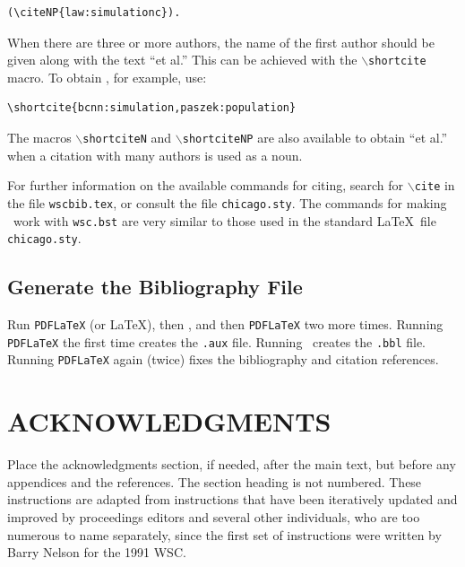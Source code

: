 \documentclass{wscpaperproc}
\theoremstyle{wsc}
\begin{document}
\begin{verbatim}
(\citeNP{law:simulationc}).
\end{verbatim}\vspace{5mm}

When there are three or more authors, the name of the first author should be given along with the text ``et al.'' This can be achieved with the {\tt $\backslash$shortcite} macro. To obtain , for example, use: \newline


\begin{verbatim}
\shortcite{bcnn:simulation,paszek:population}
\end{verbatim}\vspace{5mm}

\noindent The macros {\tt $\backslash$shortciteN} and {\tt $\backslash$shortciteNP} are also available to obtain ``et al.'' when a citation with many authors is used as a noun.

For further information on the available commands for citing, search for {\tt $\backslash$cite} in the file {\tt wscbib.tex}, or consult the file {\tt chicago.sty}. The commands for making \BibTeX\ work with {\tt wsc.bst} are very similar to those used in the standard \LaTeX\ file {\tt chicago.sty}.

\subsection{Generate the Bibliography File}

Run {\tt PDFLaTeX} (or \LaTeX), then \BibTeX, and then {\tt PDFLaTeX} two more times. Running {\tt PDFLaTeX} the first time creates the \texttt{.aux} file. Running \BibTeX\ creates the {\tt .bbl} file. Running {\tt PDFLaTeX} again (twice) fixes the bibliography and citation references.


\section*{ACKNOWLEDGMENTS}
Place the acknowledgments section, if needed, after the main text, but before any appendices and the references. The section heading is not numbered. These instructions are adapted from instructions that have been iteratively updated and improved by proceedings editors and several other individuals, who are too numerous to name separately, since the first set of instructions were written by Barry Nelson for the 1991 WSC.
\end{document}
